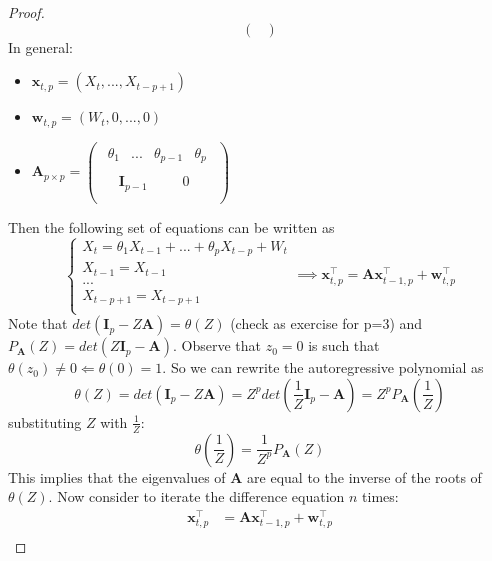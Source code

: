 \begin{proof}
\[\begin{pmatrix}
        \end{pmatrix}
    \]
    In general:
    \begin{itemize}
        \item $\boldsymbol{x}_{t,p}=(X_t,...,X_{t-p+1})$
        \item $\boldsymbol{w}_{t,p}=(W_t,0,...,0)$
        \item $\boldsymbol{A}_{p\times p}=
        \begin{pmatrix}
            \begin{array}{ccc|c}
                \theta_1&...&\theta_{p-1}&\theta_p
            \end{array}\\
            \hline
            \begin{array}{ccc|c}
                &\boldsymbol{I}_{p-1}&\ \ \ \ &0
            \end{array}\\
        \end{pmatrix}$
    \end{itemize}
    Then the following set of equations can be written as
    \[
        \begin{cases}
            X_t=\theta_1X_{t-1}+...+\theta_pX_{t-p}+W_t\\
            X_{t-1}=X_{t-1}\\
            ...\\
            X_{t-p+1}=X_{t-p+1}\\
        \end{cases}
        \implies
        \boldsymbol{x}_{t,p}^\intercal=\boldsymbol{A}\boldsymbol{x}_{t-1,p}^\intercal+\boldsymbol{w}_{t,p}^\intercal  
    \]
    Note that $det(\boldsymbol{I}_{p}-Z\boldsymbol{A})=\theta(Z)$ (check as exercise for p=3) and $P_{\boldsymbol{A}}(Z)=det(Z\boldsymbol{I}_p-\boldsymbol{A})$. Observe that $z_0=0$ is such that $\theta(z_0)\ne0\Leftarrow\theta(0)=1$. So we can rewrite the autoregressive polynomial as
    \[
        \theta(Z)=det(\boldsymbol{I}_p-Z\boldsymbol{A})=Z^pdet\left(\frac{1}{Z}\boldsymbol{I}_p-\boldsymbol{A}\right)=Z^pP_{\boldsymbol{A}}\left(\frac{1}{Z}\right)
    \]
    substituting $Z$ with $\frac{1}{Z}$:
    \[
        \theta\left(\frac{1}{Z}\right)=\frac{1}{Z^p}P_{\boldsymbol{A}}(Z)  
    \]
    This implies that the eigenvalues of $\boldsymbol{A}$ are equal to the inverse of the roots of $\theta(Z)$. Now consider to iterate the difference equation $n$ times:
    \begin{equation*}
        \begin{split}
            \boldsymbol{x}_{t,p}^\intercal&=\boldsymbol{A}\boldsymbol{x}_{t-1,p}^\intercal+\boldsymbol{w}_{t,p}^\intercal\\

\end{split}
\end{equation*}
\end{proof}
